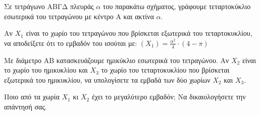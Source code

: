 \begin{figure}
\end{figure}

Σε τετράγωνο ΑΒΓΔ πλευράς $\alpha$ του παρακάτω σχήματος, γράφουμε τεταρτοκύκλιο εσωτερικά του τετραγώνου με κέντρο Α και ακτίνα $\alpha$.
\begin{alist}
    \item Αν $X_1$ είναι το χωρίο του τετραγώνου που βρίσκεται εξωτερικά του τεταρτοκυκλίου, να αποδείξετε ότι το εμβαδόν του ισούται με: $(X_1) = \frac{\alpha^2}{4} \cdot (4-\pi)$ 
    \item Με διάμετρο ΑΒ κατασκευάζουμε ημικύκλιο εσωτερικά του τετραγώνου. Αν $X_2$ είναι το χωρίο του ημικυκλίου και $X_3$ το χωρίο του τεταρτοκυκλίου που βρίσκεται εξωτερικά του ημικυκλίου, να υπολογίσετε τα εμβαδά των δύο χωρίων $X_2$ και $X_3$. 
    \item Ποιο από τα χωρία $X_1$ κι $X_2$ έχει το μεγαλύτερο εμβαδόν; Να δικαιολογήσετε την απάντησή σας. 
\end{alist}